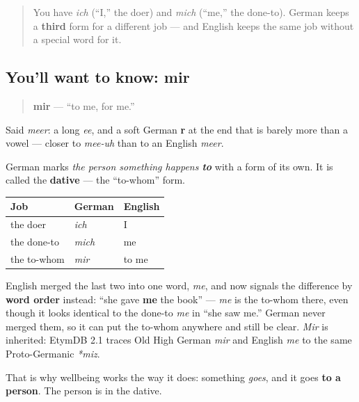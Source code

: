 \label{lesson:GE-C03-mir}



\begin{quote}
You have \emph{ich} (\textquotedblleft{}I,\textquotedblright{} the doer) and \emph{mich} (\textquotedblleft{}me,\textquotedblright{} the done-to). German keeps a \textbf{third} form for a different job — and English keeps the same job without a special word for it.
\end{quote}

\subsection*{You'll want to know: mir}
\begin{quote}
\textbf{mir} — \textquotedblleft{}to me, for me.\textquotedblright{}
\end{quote}

Said \emph{meer}: a long \emph{ee}, and a soft German \textbf{r} at the end that is barely more than a vowel — closer to \emph{mee-uh} than to an English \emph{meer}.

\begin{cousinweb}
German marks \emph{the person something happens \textbf{to}} with a form of its own. It is called the \textbf{dative} — the \textquotedblleft{}to-whom\textquotedblright{} form.

\noindent
\begin{tabularx}{\linewidth}{@{}>{\raggedright\arraybackslash}X>{\raggedright\arraybackslash}X>{\raggedright\arraybackslash}X@{}}
\toprule
\textbf{Job} & \textbf{German} & \textbf{English} \\
\midrule
the doer & \emph{ich} & I \\
the done-to & \emph{mich} & me \\
the to-whom & \emph{mir} & to me \\
\bottomrule
\end{tabularx}

English merged the last two into one word, \emph{me}, and now signals the difference by \textbf{word order} instead: \textquotedblleft{}she gave \textbf{me} the book\textquotedblright{} — \emph{me} is the to-whom there, even though it looks identical to the done-to \emph{me} in \textquotedblleft{}she saw me.\textquotedblright{} German never merged them, so it can put the to-whom anywhere and still be clear. \emph{Mir} is inherited: EtymDB 2.1 traces Old High German \emph{mir} and English \emph{me} to the same Proto-Germanic \emph{*miz}.

That is why wellbeing works the way it does: something \emph{goes}, and it goes \textbf{to a person}. The person is in the dative.
\end{cousinweb}

